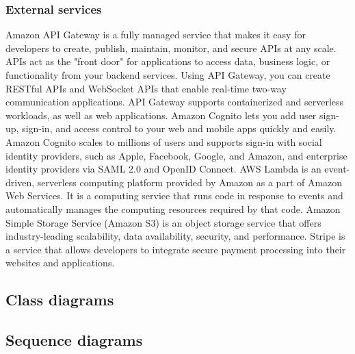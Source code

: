 \subsubsection{External services}
Amazon API Gateway is a fully managed service that makes it easy for developers to create, publish, maintain, monitor,
and secure APIs at any scale. APIs act as the "front door" for applications to access data, business logic,
or functionality from your backend services. Using API Gateway, you can create RESTful APIs and WebSocket APIs that
enable real-time two-way communication applications. API Gateway supports containerized and serverless workloads,
as well as web applications.
Amazon Cognito lets you add user sign-up, sign-in, and access control to your web and mobile apps quickly and easily.
Amazon Cognito scales to millions of users and supports sign-in with social identity providers, such as Apple,
Facebook, Google, and Amazon, and enterprise identity providers via SAML 2.0 and OpenID Connect.
AWS Lambda is an event-driven, serverless computing platform provided by Amazon as a part of Amazon Web Services.
It is a computing service that runs code in response to events and automatically manages the computing resources required by that code.
Amazon Simple Storage Service (Amazon S3) is an object storage service that offers industry-leading scalability,
data availability, security, and performance.
Stripe is a service that allows developers to integrate secure payment processing into their websites and applications.
\subsection{Class diagrams}
\subsection{Sequence diagrams}